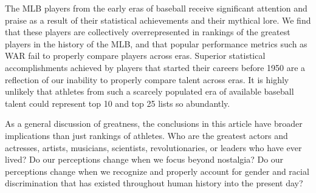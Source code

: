 \documentclass[11pt]{article}\usepackage[]{graphicx}\usepackage[]{color}
\begin{document}

The MLB players from the early eras of baseball receive significant attention 
and praise as a result of their statistical achievements and their mythical 
lore.  We find that these players are collectively overrepresented in 
rankings of the greatest players in the history of the MLB, and that popular 
performance metrics such as WAR fail to properly compare players across eras.  
Superior statistical accomplishments achieved 
by players that started their careers before 1950 are a reflection of our 
inability to properly compare talent across eras.  It is highly unlikely that 
athletes from such a scarcely populated era of available baseball talent 
could represent top 10 and top 25 lists so abundantly. 


As a general discussion of greatness, the conclusions in this article have 
broader implications than just rankings of athletes. 
Who are the greatest  
actors and actresses, 
artists,
musicians, 
scientists, 
revolutionaries,
or 
leaders who have ever lived?  
Do our perceptions change when we focus beyond nostalgia?  
Do our perceptions change when we recognize and properly account for 
gender and racial discrimination that has existed throughout human 
history into the present day?  

\end{document}
